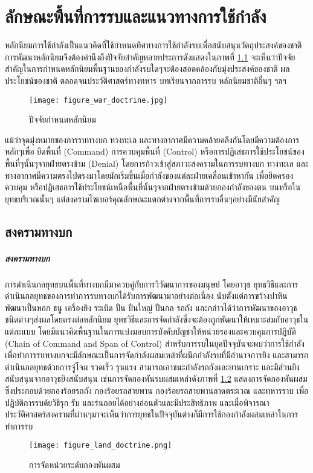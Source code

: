 \documentclass[../th_cyber_warfare_distilled.tex]{subfiles}
\begin{document}
\chapter{ลักษณะพื้นที่การรบและแนวทางการใช้กำลัง}
 หลักนิยมการใช้กำลังเป็นแนวคิดที่ใช้กำหนดทิศทางการใช้กำลังรบเพื่อสนับสนุนวัตถุประสงค์ของชาติ การพัฒนาหลักนิยมจึงต้องคำนึงถึงปัจจัยสำคัญหลายประการดังแสดงในภาพที่ \ref{figure:war_doctrine} จะเห็นว่าปัจจัยสำคัญในการกำหนดหลักนิยมพื้นฐานของกำลังรบใดๆจะต้องสอดคล้องกับมุ่งประสงค์ของชาติ ผลประโยชน์ของชาติ ตลอดจนประวัติศาสตร์ทางทหาร บทเรียนจากการรบ หลักนิยมชาติอื่นๆ ฯลฯ 

\begin{figure}
	\texttt{[image: figure\_war\_doctrine.jpg]}
	\centering
	\caption{ปัจจัยกำหนดหลักนิยม}
	\label{figure:war_doctrine}
\end{figure}


แม้ว่าจุดมุ่งหมายของการรบทางบก ทางทะเล และทางอากาศมีความคล้ายคลึงกันโดยมีความต้องการหลักๆเพื่อ ยึดพื้นที่ (Command) การควบคุมพื้นที่ (Control) หรือการปฏิเสธการใช้ประโยชน์ของพื้นที่ๆนั้นๆจากฝ่ายตรงข้าม (Denial) โดยการก้าวเข้าสู่สภาวะสงครามในการรบทางบก ทางทะเล และทางอากาศมีความตรงไปตรงมาโดยมักเริ่มขึ้นเมื่อกำลังของแต่ละฝ่ายเคลื่อนเข้าหากัน เพื่อยึดครอง ควบคุม หรือปฏิเสธการใช้ประโยชน์เหนือพื้นที่นั้นๆจากฝ่ายตรงข้ามด้วยกองกำลังของตน บนหรือในยุทธบริเวณนั้นๆ แต่สงครามไซเบอร์คุณลักษณะแตกต่างจากพื้นที่การรบอื่นๆอย่างมีนัยสำคัญ

\section{สงครามทางบก}
\paragraph{สงครามทางบก}
การดำเนินกลยุทธบนพื้นที่ทางบกมีมาควบคู่กับการวิวัฒนาการของมนุษย์ โดยอาวุธ ยุทธวิธีและการดำเนินกลยุทธของการทำการรบทางบกได้รับการพัฒนามาอย่างต่อเนื่อง นับตั้งแต่การขว้างปาหิน พัฒนาเป็นหอก ธนู เครื่องยิง ระเบิด ปืน ปืนใหญ่ ปืนกล รถถัง และกล่าวได้ว่าการพัฒนาของอาวุธชนิดต่างๆส่งผลโดยตรงต่อหลักนิยม ยุทธวิธีและการจัดกำลังซึ่งจะต้องถูกพัฒนาให้เหมาะสมกับอาวุธในแต่ละแบบ โดยมีแนวคิดพื้นฐานในการแบ่งมอบการบังคับบัญชาให้หน่วยรองและควบคุมการปฏิบัติ (Chain of Command and Span of Control) สำหรับการรบในยุคปัจจุบันจะพบว่าการใช้กำลังเพื่อทำการรบทางบกจะมีลักษณะเป็นการจัดกำลังผสมเหล่าที่ผนึกกำลังรบที่มีอำนาจการยิง และสามารถดำเนินกลยุทธด้วยการจู่โจม รวดเร็ว รุนแรง สามารถเอาชนะกำลังรถถังและยานเกราะ และมีส่วนยิงสนับสนุนจากอาวุธยิงสนับสนุน เช่นการจัดกองพันรบผสมเหล่าดังภาพที่ \ref{figure:combined_army_battalion} แสดงการจัดกองพันผสมซึ่งประกอบด้วยกองร้อยรถถัง กองร้อยรถสายพาน กองร้อยรถสายพานลาดตระเวณ และทหารราบ เพื่อปฏิบัติการรบด้ยวิธีรุก รับ และร่นถอยได้อย่างอ่อนตัวและมีประสิทธิภาพ และเมื่อพิจารณาประวัติศาสตร์สงครามที่ผ่านๆมาจะเห็นว่าการยุทธในปัจจุบันต่างก็มีการใช้กองกำลังผสมเหล่าในการทำการรบ
\begin{figure}
	\texttt{[image: figure\_land\_doctrine.png]}
	\centering
	\caption{การจัดหน่วยระดับกองพันผสม}
	\label{figure:combined_army_battalion}
\end{figure}
\end{document}
